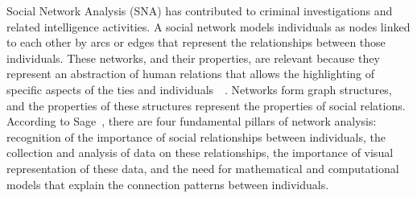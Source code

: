 Social Network Analysis (SNA) has contributed to criminal investigations and related intelligence activities. A social network models individuals as nodes linked to each other by arcs or edges that represent the relationships between those individuals. These networks, and their properties, are relevant because they represent an abstraction of human relations that allows the highlighting of specific aspects of the ties and individuals~\cite{pm2018practical}~\cite{burcher2020social}. Networks form graph structures, and the properties of these structures represent the properties of social relations. According to Sage~\cite{scott2011sage}, there are four fundamental pillars of network analysis: recognition of the importance of social relationships between individuals, the collection and analysis of data on these relationships, the importance of visual representation of these data, and the need for mathematical and computational models that explain the connection patterns between individuals.


